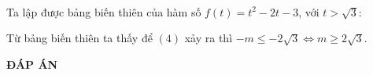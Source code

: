\begin{ex}
{\\Ta lập được bảng biến thiên của hàm số $f\left( {t} \right)=t^2-2t-3$, với $t>\sqrt{3}$:
\begin{center}
\end{center}
Từ bảng biến thiên ta thấy để $\left( {4} \right)$ xảy ra thì $-m\le -2\sqrt{3}\Leftrightarrow m \ge 2\sqrt{3}$.}
\end{ex}
\newpage
\begin{center}
	\textbf{ĐÁP ÁN}
\end{center}
\begin{multicols}{10}
	 
\end{multicols}

